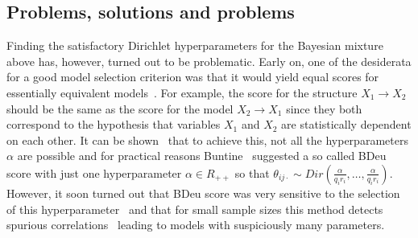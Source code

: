 \documentclass[letterpaper]{article}
\begin{document}
\subsection {Problems, solutions and problems}

Finding the satisfactory Dirichlet hyperparameters for the Bayesian
mixture above has, however, turned out to be problematic. Early on,
one of the desiderata for a good model selection criterion was that it
would yield equal scores for essentially equivalent
models~\cite{Verm90}.  For example, the score for the structure
$X_1\rightarrow X_2$ should be the same as the score for the model
$X_2 \rightarrow X_1$ since they both correspond to the hypothesis
that variables $X_1$ and $X_2$ are statistically dependent on each
other.  It can be shown~\cite{Heck95} that to achieve this, not all
the hyperparameters $\alpha$ are possible and for practical reasons
Buntine~\cite{Bunt91} suggested a so called BDeu score with just one
hyperparameter $\alpha\in R_{++}$ so that $\theta_{ij\cdot}\sim
Dir(\frac{\alpha}{q_i r_i},\ldots,\frac{\alpha}{q_i r_i})$.  However,
it soon turned out that BDeu score was very sensitive to the selection
of this hyperparameter~\cite{cosco.uai07} and that for small sample
sizes this method detects spurious correlations~\cite{Steck08} leading
to models with suspiciously many parameters.
\end{document}
